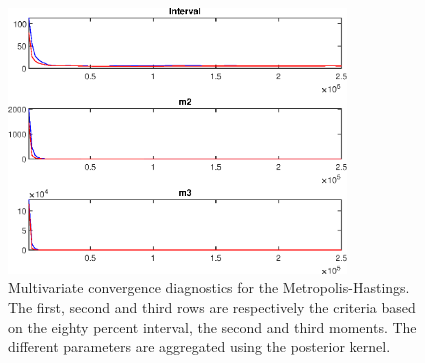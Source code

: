  
\begin{figure}[H]
\centering 
\includegraphics[width=0.8\textwidth]{BRS_growth_alt/Output/BRS_growth_alt_mdiag}
\caption{Multivariate convergence diagnostics for the Metropolis-Hastings.
The first, second and third rows are respectively the criteria based on
the eighty percent interval, the second and third moments. The different 
parameters are aggregated using the posterior kernel.}\label{Fig:MultivariateDiagnostics}
\end{figure}


